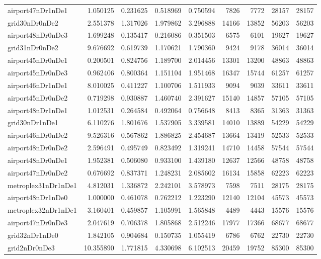\begin{longtable}{|l|r|r|r|r|r|r|r|r|}
airport47nDr1nDe1 & 1.050125 & 0.231625 & 0.518969 & 0.750594 & 7826 & 7772 & 28157 & 28157 \\
grid30nDr0nDe2 & 2.551378 & 1.317026 & 1.979862 & 3.296888 & 14166 & 13852 & 56203 & 56203 \\
airport48nDr0nDe3 & 1.699248 & 0.135417 & 0.216086 & 0.351503 & 6575 & 6101 & 19627 & 19627 \\
grid31nDr0nDe2 & 9.676692 & 0.619739 & 1.170621 & 1.790360 & 9424 & 9178 & 36014 & 36014 \\
airport45nDr0nDe1 & 0.200501 & 0.824756 & 1.189700 & 2.014456 & 13301 & 13200 & 48863 & 48863 \\
airport45nDr0nDe3 & 0.962406 & 0.800364 & 1.151104 & 1.951468 & 16347 & 15744 & 61257 & 61257 \\
airport46nDr1nDe1 & 8.010025 & 0.411227 & 1.100706 & 1.511933 & 9094 & 9039 & 33611 & 33611 \\
airport45nDr0nDe2 & 0.719298 & 0.930887 & 1.460740 & 2.391627 & 15140 & 14857 & 57105 & 57105 \\
airport48nDr1nDe1 & 1.012531 & 0.264584 & 0.492064 & 0.756648 & 8413 & 8365 & 31363 & 31363 \\
grid30nDr1nDe1 & 6.110276 & 1.801676 & 1.537905 & 3.339581 & 14010 & 13889 & 54229 & 54229 \\
airport46nDr0nDe2 & 9.526316 & 0.567862 & 1.886825 & 2.454687 & 13664 & 13419 & 52533 & 52533 \\
airport48nDr0nDe2 & 2.596491 & 0.495749 & 0.823492 & 1.319241 & 14710 & 14458 & 57544 & 57544 \\
airport48nDr0nDe1 & 1.952381 & 0.506080 & 0.933100 & 1.439180 & 12637 & 12566 & 48758 & 48758 \\
airport47nDr0nDe2 & 0.676692 & 0.837371 & 1.248231 & 2.085602 & 16134 & 15858 & 62223 & 62223 \\
metroplex31nDr1nDe1 & 4.812031 & 1.336872 & 2.242101 & 3.578973 & 7598 & 7511 & 28175 & 28175 \\
airport48nDr1nDe0 & 1.000000 & 0.461078 & 0.762212 & 1.223290 & 12140 & 12104 & 45573 & 45573 \\
metroplex32nDr1nDe1 & 3.160401 & 0.459857 & 1.105991 & 1.565848 & 4489 & 4443 & 15576 & 15576 \\
airport47nDr0nDe3 & 2.047619 & 0.706378 & 1.805868 & 2.512246 & 17977 & 17366 & 68677 & 68677 \\
grid32nDr1nDe0 & 1.842105 & 0.904684 & 0.150735 & 1.055419 & 6786 & 6762 & 22730 & 22730 \\
grid2nDr0nDe3 & 10.355890 & 1.771815 & 4.330698 & 6.102513 & 20459 & 19752 & 85300 & 85300 \\

\end{longtable}
